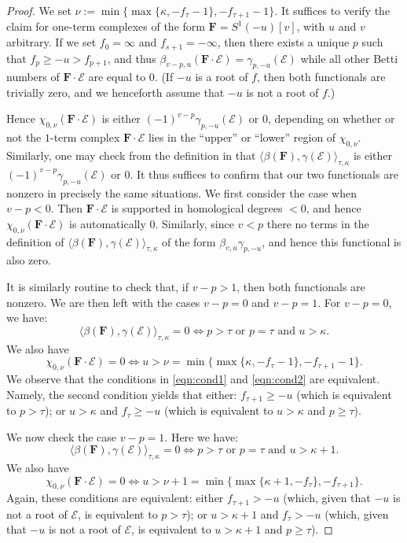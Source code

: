 \documentclass[12pt]{amsart}
\theoremstyle{definition}
\theoremstyle{remark}
\newcommand{\cE}{\mathcal{E}}
\newcommand{\FF}{\mathbf{F}}
\begin{document}
\begin{proof} 
We set $\nu:=\min\{\max\{\kappa, -f_{\tau}-1\},-f_{\tau+1}-1\}$.  It suffices to verify the claim for one-term complexes of the form $\FF=S^1(-u)[v]$, with $u$ and $v$ arbitrary.  
If we set $f_0=\infty$ and $f_{s+1}=-\infty$, then there exists a unique $p$ such that $f_p\geq -u>f_{p+1}$, and thus  $\beta_{v-p,u}(\FF\cdot \cE)=\gamma_{p,-u}(\cE)$ while all other Betti numbers  of $\FF\cdot \cE$ are equal to $0$.  (If $-u$ is a root of $f$, then both functionals are trivially zero, and we henceforth assume that $-u$ is not a root of $f$.)


Hence $\chi_{0, \nu}(\FF\cdot \cE)$ is either $(-1)^{v-p}\gamma_{p,-u}(\cE)$ or $0$, depending on whether or not the $1$-term complex $\FF\cdot \cE$ lies in the ``upper'' or ``lower'' region of $\chi_{0,\nu}$.  Similarly, one may check from the definition in \cite{eis-schrey-icm} that $\langle \beta(\FF),\gamma(\cE)\rangle_{\tau,\kappa}$ is either $(-1)^{v-p}\gamma_{p,-u}(\cE)$ or $0$.  
It thus suffices to confirm that our two functionals are nonzero in precisely the same situations.  We first consider the case when $v-p<0$.  Then $\FF\cdot \cE$ is supported in homological degrees $<0$, and hence $\chi_{0, \nu}(\FF\cdot \cE)$ is automatically $0$. Similarly, since $v<p$ there no terms in the definition of $\langle \beta(\FF),\gamma(\cE)\rangle_{\tau,\kappa}$ of the form $\beta_{v,u}\gamma_{p,-u}$, and hence this functional is also zero.  

It is similarly routine to check that, if $v-p>1$, then both functionals are nonzero.  We are then left with the cases $v-p=0$ and $v-p=1$.  For $v-p=0$, we have:
\begin{equation}\label{eqn:cond1}
\langle \beta(\FF),\gamma(\cE)\rangle_{\tau,\kappa}=0 \iff p> \tau \text{ or } p=\tau \text{ and } u>\kappa.
\end{equation}
We also have
\begin{equation}\label{eqn:cond2}
\chi_{0,\nu}(\FF\cdot \cE)=0 \iff u> \nu=\min\{\max\{\kappa, -f_{\tau}-1\},-f_{\tau+1}-1\}.
\end{equation}
We observe that the conditions in \eqref{eqn:cond1} and \eqref{eqn:cond2} are equivalent.  Namely, the second condition yields that either: $f_{\tau+1}\geq-u$ (which is equivalent to $p>\tau$); or $u>\kappa$ and $f_{\tau}\geq -u$ (which is equivalent to $u>\kappa$ and $p\geq \tau$). 

We now check the case $v-p=1$.  Here we have:
\begin{equation}\label{eqn:cond3}
\langle \beta(\FF),\gamma(\cE)\rangle_{\tau,\kappa}=0 \iff p> \tau \text{ or } p=\tau \text{ and } u>\kappa+1.
\end{equation}
We also have
\begin{equation}\label{eqn:cond4}
\chi_{0,\nu}(\FF\cdot \cE)=0 \iff u> \nu+1=\min\{\max\{\kappa+1, -f_{\tau}\},-f_{\tau+1}\}.
\end{equation}
Again, these conditions are equivalent: either $f_{\tau+1}>-u$ (which, given that $-u$ is not a root of $\cE$, is equivalent to $p>\tau$); or $u>\kappa+1$ and $f_{\tau}>-u$ (which, given that $-u$ is not a root of $\cE$, is equivalent to $u>\kappa+1$ and $p\geq \tau$). 
\end{proof}
\end{document}
